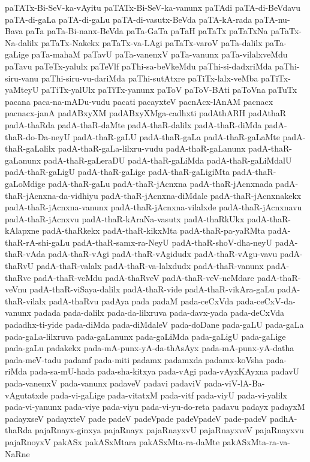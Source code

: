 {paTATx-Bi-SeV-ka-vAyitu
paTATx-Bi-SeV-ka-vanunx
paTAdi
paTA-di-BeVdavu
paTA-di-gaLa
paTA-di-gaLu
paTA-di-vasutx-BeVda
paTA-kA-rada
paTA-nu-Bava
paTa
paTa-Bi-nanx-BeVda
paTa-GaTa
paTaH
paTaTx
paTaTxNa
paTaTx-Na-dalilx
paTaTx-Nakekx
paTaTx-va-LAgi
paTaTx-varoV
paTa-dalilx
paTa-gaLige
paTa-mahaM
paTavU
paTa-vanenxV
paTa-vanunx
paTa-vilalxveMdu
paTavu
paTeTx-yalulx
paTeVlf
paThi-sa-beVkeMdu
paThi-si-dadxriMda
paThi-siru-vanu
paThi-siru-vu-dariMda
paThi-sutAtxre
paTiTx-lalx-veMba
paTiTx-yaMteyU
paTiTx-yalUlx
paTiTx-yanunx
paToV
paToV-BAti
paToVna
paTuTx
pacana
paca-na-mADu-vudu
pacati
pacayxteV
pacnAcx-lAnAM
pacnacx
pacnacx-janA
padABxyXM
padABxyXMga-cadhxti
padAthARH
padAthaR
padA-thaRda
padA-thaR-daMte
padA-thaR-dalilx
padA-thaR-diMda
padA-thaR-do-Da-neyU
padA-thaR-gaLU
padA-thaR-gaLa
padA-thaR-gaLaMte
padA-thaR-gaLalilx
padA-thaR-gaLa-lilxru-vudu
padA-thaR-gaLanunx
padA-thaR-gaLanunx
padA-thaR-gaLeraDU
padA-thaR-gaLiMda
padA-thaR-gaLiMdalU
padA-thaR-gaLigU
padA-thaR-gaLige
padA-thaR-gaLigiMta
padA-thaR-gaLoMdige
padA-thaR-gaLu
padA-thaR-jAcnxna
padA-thaR-jAcnxnada
padA-thaR-jAcnxna-da-vidhiyu
padA-thaR-jAcnxna-diMdale
padA-thaR-jAcnxnakekx
padA-thaR-jAcnxna-vanunx
padA-thaR-jAcnxna-vilalxde
padA-thaR-jAcnxnavu
padA-thaR-jAcnxvu
padA-thaR-kAraNa-vasutx
padA-thaRkUkx
padA-thaR-kAlapxne
padA-thaRkekx
padA-thaR-kikxMta
padA-thaR-pa-yaRMta
padA-thaR-rA-shi-gaLu
padA-thaR-samx-ra-NeyU
padA-thaR-shoV-dha-neyU
padA-thaR-vAda
padA-thaR-vAgi
padA-thaR-vAgidudx
padA-thaR-vAgu-vavu
padA-thaRvU
padA-thaR-valalx
padA-thaR-va-lalxdudx
padA-thaR-vanunx
padA-thaRve
padA-thaR-veMdu
padA-thaRveV
padA-thaR-veV-neMdare
padA-thaR-veVnu
padA-thaR-viSaya-dalilx
padA-thaR-vide
padA-thaR-vikAra-gaLu
padA-thaR-vilalx
padA-thaRvu
padAya
pada
padaM
pada-ceCxVda
pada-ceCxV-da-vanunx
padada
pada-dalilx
pada-da-lilxruva
pada-davx-yada
pada-deCxVda
padadhx-ti-yide
pada-diMda
pada-diMdaleV
pada-doDane
pada-gaLU
pada-gaLa
pada-gaLa-lilxruva
pada-gaLanunx
pada-gaLiMda
pada-gaLigU
pada-gaLige
pada-gaLu
padakekx
pada-mA-punx-yA-da-thAsAyx
pada-mA-punx-yA-datha
pada-meV-tadu
padamf
pada-miti
padamx
padamxda
padamx-koVsha
pada-riMda
pada-sa-mU-hada
pada-sha-kitxya
pada-vAgi
pada-vAyxKAyxna
padavU
pada-vanenxV
pada-vanunx
padaveV
padavi
padaviV
pada-viV-lA-Ba-vAgutatxde
pada-vi-gaLige
pada-vitatxM
pada-vitf
pada-viyU
pada-vi-yalilx
pada-vi-yanunx
pada-viye
pada-viyu
pada-vi-yu-do-reta
padavu
padayx
padayxM
padayxseV
padayxteV
pade
padeV
padeVpade
padeVpadeV
pade-padeV
padhA-thaRda
pajaRnayx-ginxya
pajaRnayx
pajaRnayxvU
pajaRnayxveV
pajaRnayxvu
pajaRnoyxV
pakASx
pakASxMtara
pakASxMta-ra-daMte
pakASxMta-ra-va-NaRne
}

